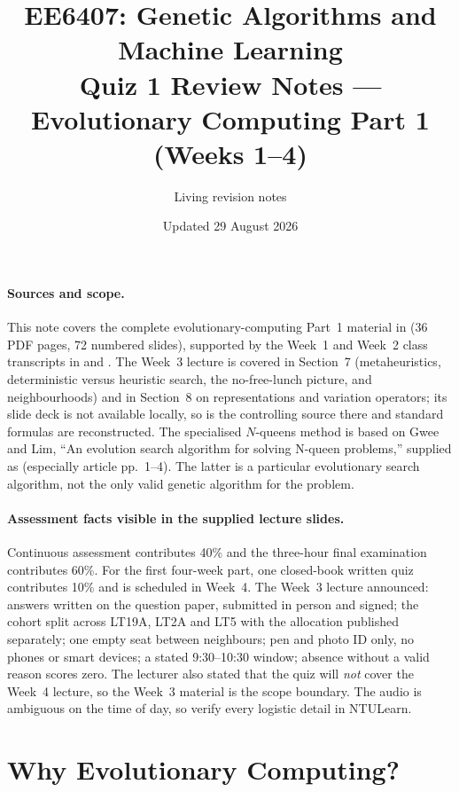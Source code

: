 \documentclass[11pt,a4paper]{article}
\title{EE6407: Genetic Algorithms and Machine Learning\\
       \large Quiz 1 Review Notes --- Evolutionary Computing Part 1
       (Weeks 1--4)}
\author{Living revision notes}
\date{Updated 29 August 2026}
\begin{document}
\maketitle

\paragraph{Sources and scope.}
This note covers the complete evolutionary-computing Part~1 material in
(36 PDF pages, 72 numbered slides), supported by the Week~1 and Week~2 class
transcripts in  and
. The Week~3 lecture is covered in
Section~7 (metaheuristics, deterministic versus heuristic search, the
no-free-lunch picture, and neighbourhoods) and in Section~8 on representations
and variation operators; its slide deck is not
available locally, so  is the
controlling source there and standard formulas are reconstructed. The specialised $N$-queens method
is based on Gwee and
Lim, ``An evolution search algorithm for solving N-queen problems,'' supplied
as  (especially
article pp.~1--4). The latter is a
particular evolutionary search algorithm, not the only valid genetic
algorithm for the problem.

\paragraph{Assessment facts visible in the supplied lecture slides.}
Continuous assessment contributes 40\% and the three-hour final examination
contributes 60\%.  For the first four-week part, one closed-book written quiz
contributes 10\% and is scheduled in Week~4.  The Week~3 lecture announced:
answers written on the question paper, submitted in person and signed;
the cohort split across LT19A, LT2A and LT5 with the allocation published
separately; one empty seat between neighbours; pen and photo ID only, no
phones or smart devices; a stated 9:30--10:30 window; absence without a valid
reason scores zero. The lecturer also stated that the quiz will \emph{not}
cover the Week~4 lecture, so the Week~3 material is the scope boundary.  The
audio is ambiguous on the time of day, so verify every logistic detail in
NTULearn.

\tableofcontents

\section{Why Evolutionary Computing?}
\end{document}
